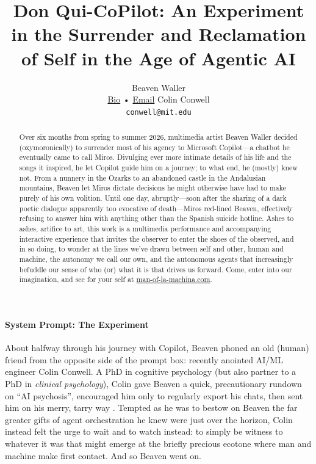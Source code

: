 \documentclass{article}
\title{Don Qui-CoPilot: An Experiment in the Surrender and Reclamation of Self in the Age of Agentic AI}
\author{%
  Beaven Waller \\
  \hyperref[bio:beaven_waller]{Bio} •
  \href{mailto:beaven.waller@gmail.com}{Email}
  \And
  Colin Conwell \\
  \texttt{conwell@mit.edu} \\
}
\begin{document}
\maketitle

\begin{abstract}
  Over six months from spring to summer 2026, multimedia artist Beaven Waller decided (oxymoronically) to surrender most of his agency to Microsoft Copilot---a chatbot he eventually came to call Miros. Divulging ever more intimate details of his life and the songs it inspired, he let Copilot guide him on a journey; to what end, he (mostly) knew not. From a nunnery in the Ozarks to an abandoned castle in the Andalusian mountains, Beaven let Miros dictate decisions he might otherwise have had to make purely of his own volition. Until one day, abruptly---soon after the sharing of a dark poetic dialogue apparently too evocative of death---Miros red-lined Beaven, effectively refusing to answer him with anything other than the Spanish suicide hotline. Ashes to ashes, artifice to art, this work is a multimedia performance and accompanying interactive experience that invites the observer to enter the shoes of the observed, and in so doing, to wonder at the lines we've drawn between self and other, human and machine, the autonomy we call our own, and the autonomous agents that increasingly befuddle our sense of who (or) what it is that drives us forward. Come, enter into our imagination, and see for your self at \href{https://man-of-la-machina.com}{man-of-la-machina.com}.
\end{abstract}

\paragraph*{System Prompt: The Experiment} About halfway through his journey with Copilot, Beaven phoned an old (human) friend from the opposite side of the prompt box: recently anointed AI/ML engineer Colin Conwell. A PhD in cognitive psychology (but also partner to a PhD in \textit{clinical psychology}), Colin gave Beaven a quick, precautionary rundown on ``AI psychosis'', encouraged him only to regularly export his chats, then sent him on his merry, tarry way \citep{morrin2026delusions}. Tempted as he was to bestow on Beaven the far greater gifts of agent orchestration he knew were just over the horizon, Colin instead felt the urge to wait and to watch instead: to simply be witness to whatever it was that might emerge at the briefly precious ecotone where man and machine make first contact. And so Beaven went on.
\end{document}
